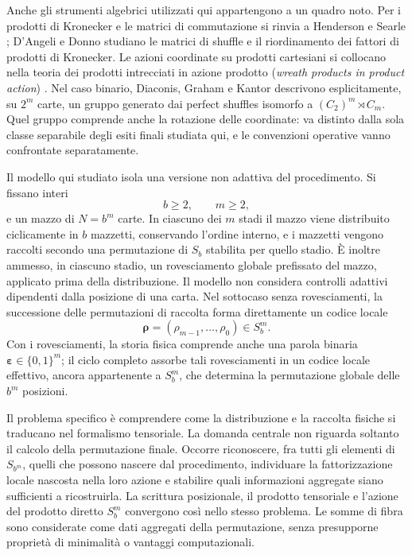 	Anche gli strumenti algebrici utilizzati qui appartengono a un quadro noto.
	Per i prodotti di Kronecker e le matrici di commutazione si rinvia a
	Henderson e Searle \cite{henderson-searle}; D'Angeli e Donno
	\cite{dangeli-donno} studiano le matrici di shuffle e il riordinamento dei
	fattori di prodotti di Kronecker. Le azioni coordinate su prodotti cartesiani
	si collocano nella teoria dei prodotti intrecciati in azione prodotto
	(\emph{wreath products in product action}) \cite{praeger-schneider}.
	Nel caso binario, Diaconis, Graham e Kantor
	\cite[Lemma~4]{diaconis-graham-kantor} descrivono esplicitamente, su
	\(2^m\) carte, un gruppo generato dai perfect shuffles isomorfo a
	\((C_2)^m\rtimes C_m\). Quel gruppo comprende anche la rotazione delle
	coordinate: va distinto dalla sola classe separabile degli esiti finali
	studiata qui, e le convenzioni operative vanno confrontate separatamente.

	Il modello qui studiato isola una versione non adattiva del procedimento. Si
	fissano interi
	\[
	b\ge 2,
	\qquad
	m\ge 2,
	\]
	e un mazzo di \(N=b^m\) carte. In ciascuno dei \(m\) stadi il mazzo viene
	distribuito ciclicamente in \(b\) mazzetti, conservando l'ordine interno, e i
	mazzetti vengono raccolti secondo una permutazione di \(S_b\) stabilita per
	quello stadio. È inoltre ammesso, in ciascuno stadio, un rovesciamento globale
	prefissato del mazzo, applicato prima della distribuzione. Il modello non
	considera controlli adattivi dipendenti dalla posizione di una carta. Nel sottocaso senza rovesciamenti, la successione delle
	permutazioni di raccolta forma direttamente un codice locale
	\[
	\boldsymbol{\rho}
	=
	(\rho_{m-1},\dots,\rho_0)
	\in S_b^m.
	\]
	Con i rovesciamenti, la storia fisica comprende anche una parola binaria
	\(\boldsymbol{\varepsilon}\in\{0,1\}^m\); il ciclo completo assorbe tali
	rovesciamenti in un codice locale effettivo, ancora appartenente a
	\(S_b^m\), che determina la permutazione globale delle \(b^m\) posizioni.

	Il problema specifico è comprendere come la distribuzione e la raccolta
	fisiche si traducano nel formalismo tensoriale. La domanda centrale non
	riguarda soltanto il calcolo della permutazione finale.
	Occorre riconoscere, fra tutti gli elementi di \(S_{b^m}\), quelli che possono
	nascere dal procedimento, individuare la fattorizzazione locale nascosta nella
	loro azione e stabilire quali informazioni aggregate siano sufficienti a
	ricostruirla. La scrittura posizionale, il prodotto tensoriale e l'azione del
	prodotto diretto \(S_b^m\) convergono così nello stesso problema.
	Le somme di fibra sono considerate come dati aggregati della permutazione,
	senza presupporne proprietà di minimalità o vantaggi computazionali.

